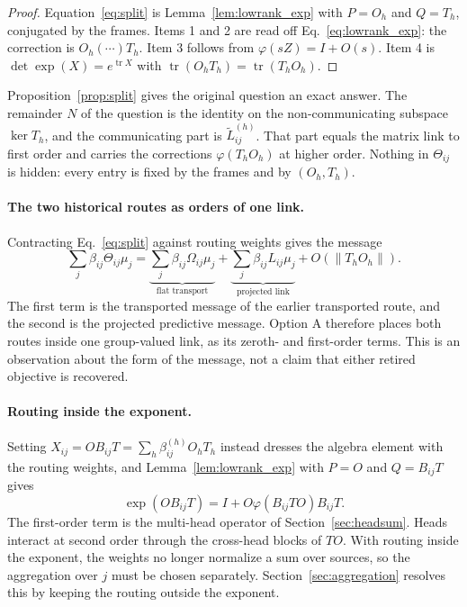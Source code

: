 \documentclass[11pt]{article}
\theoremstyle{definition}
\theoremstyle{remark}
\newcommand{\tr}{\operatorname{tr}}
\begin{document}
\begin{proof}
Equation~\eqref{eq:split} is Lemma~\ref{lem:lowrank_exp} with $P=O_h$ and $Q=T_h$, conjugated by the frames. Items 1 and 2 are read off Eq.~\eqref{eq:lowrank_exp}: the correction is $O_h(\cdots)T_h$. Item 3 follows from $\varphi(sZ)=I+O(s)$. Item 4 is $\det\exp(X)=e^{\tr X}$ with $\tr(O_hT_h)=\tr(T_hO_h)$.
\end{proof}

Proposition~\ref{prop:split} gives the original question an exact answer. The remainder $N$ of the question is the identity on the non-communicating subspace $\ker T_h$, and the communicating part is $\widetilde L_{ij}^{(h)}$. That part equals the matrix link to first order and carries the corrections $\varphi(T_hO_h)$ at higher order. Nothing in $\Theta_{ij}$ is hidden: every entry is fixed by the frames and by $(O_h,T_h)$.

\paragraph{The two historical routes as orders of one link.}
Contracting Eq.~\eqref{eq:split} against routing weights gives the message
\begin{equation}
\sum_j\beta_{ij}\Theta_{ij}\mu_j
=\underbrace{\sum_j\beta_{ij}\Omega_{ij}\mu_j}_{\text{flat transport}}
+\underbrace{\sum_j\beta_{ij}L_{ij}\mu_j}_{\text{projected link}}+O(\|T_hO_h\|).
\label{eq:two_routes}
\end{equation}
The first term is the transported message of the earlier transported route, and the second is the projected predictive message. Option A therefore places both routes inside one group-valued link, as its zeroth- and first-order terms. This is an observation about the form of the message, not a claim that either retired objective is recovered.

\paragraph{Routing inside the exponent.}
Setting $X_{ij}=OB_{ij}T=\sum_h\beta_{ij}^{(h)}O_hT_h$ instead dresses the algebra element with the routing weights, and Lemma~\ref{lem:lowrank_exp} with $P=O$ and $Q=B_{ij}T$ gives
\begin{equation}
\exp(OB_{ij}T)=I+O\varphi(B_{ij}TO)B_{ij}T.
\label{eq:exp_routed}
\end{equation}
The first-order term is the multi-head operator of Section~\ref{sec:headsum}. Heads interact at second order through the cross-head blocks of $TO$. With routing inside the exponent, the weights no longer normalize a sum over sources, so the aggregation over $j$ must be chosen separately. Section~\ref{sec:aggregation} resolves this by keeping the routing outside the exponent.
\end{document}
